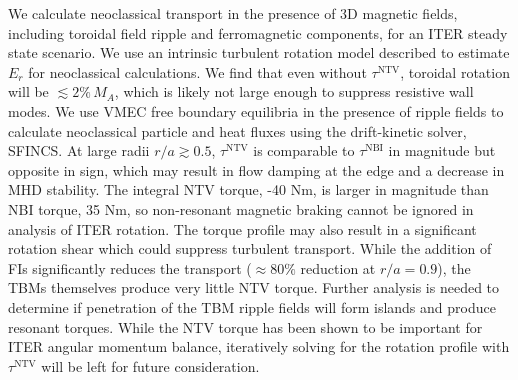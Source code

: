 \documentclass[aip, pop, preprint]{revtex4-1}
\numberwithin{figure}{section}
\numberwithin{equation}{section}
\begin{document}
We calculate neoclassical transport in the presence of 3D magnetic fields, including toroidal field ripple and ferromagnetic components, for an ITER steady state scenario. We use an intrinsic turbulent rotation model described to estimate $E_r$ for neoclassical calculations. We find that even without $\tau^{\text{NTV}}$, toroidal rotation will be $\lesssim 2\% \,M_A$, which is likely not large enough to suppress resistive wall modes.\cite{Liu2004} We use VMEC free boundary equilibria in the presence of ripple fields to calculate neoclassical particle and heat fluxes using the drift-kinetic solver, SFINCS. At large radii $r/a \gtrsim 0.5$, $\tau^{\text{NTV}}$ is comparable to $\tau^{\text{NBI}}$ in magnitude but opposite in sign, which may result in flow damping at the edge and a decrease in MHD stability. The integral NTV torque, -40 Nm, is larger in magnitude than NBI torque, 35 Nm, so non-resonant magnetic braking cannot be ignored in analysis of ITER rotation. The torque profile may also result in a significant rotation shear which could suppress turbulent transport. While the addition of FIs significantly reduces the transport ($\approx 80\%$ reduction at $r/a = 0.9$), the TBMs themselves produce very little NTV torque. Further analysis is needed to determine if penetration of the TBM ripple fields will form islands and produce resonant torques. While the NTV torque has been shown to be important for ITER angular momentum balance, iteratively solving for the rotation profile with $\tau^{\text{NTV}}$ will be left for future consideration.

\appendix
\end{document}
